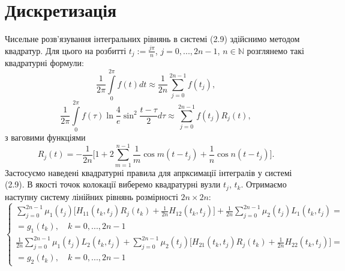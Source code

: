 \documentclass[a4 paper,12pt,ukrainian]{report}
\begin{document}
\section{Дискретизація}
\hspace*{\parindent}Чисельне розв'язування інтегральних рівнянь в системі (2.9) здійснимо методом квадратур. Для цього на розбитті $t_{j}:=\frac{j\pi}{n}$, $j=0,...,2n-1$, $n\in\mathbb{N}$ розглянемо такі квадратурні формули:
\begin{equation*}
\displaystyle
\frac{1}{2\pi}\int\limits_{0}^{2\pi}f(t)dt\approx
\frac{1}{2n}\sum\limits_{j=0}^{2n-1}f(t_{j}),
\end{equation*}
\begin{equation*}
\displaystyle
\frac{1}{2\pi}\int\limits_{0}^{2\pi}f(\tau)\ln{\frac{4}{e}\sin^2\frac{t-\tau}{2}}d\tau\approx\sum\limits_{j=0}^{2n-1}f(t_{j})R_{j}(t),
\end{equation*}
з ваговими функціями
\begin{equation*}
\displaystyle
R_{j}(t) = -\frac{1}{2n}\Big[1+2\sum\limits_{m=1}^{n-1}{\frac{1}{m}\cos{m(t-t_{j})}} + \frac{1}{n}\cos{n(t-t_{j})}\Big].
\end{equation*}
\hspace*{\parindent}Застосуємо наведені квадратурні правила для апрксимації інтегралів у системі (2.9). В якості точок колокації виберемо квадратурні вузли $t_{j}$, $t_{k}$. Отримаємо наступну систему лінійних рівнянь розмірності $2n\times 2n$:
\begin{equation}
\left\{
\begin{array}{c}
\displaystyle
\sum\limits_{j=0}^{2n-1} \mu_1(t_j)\Big[H_{11}(t_k,t_j)R_j(t_k)+\frac{1}{2n}H_{12}(t_k,t_j)\Big]+\frac{1}{2n}\sum\limits_{j=0}^{2n-1} \mu_2(t_j)L_1(t_k,t_j)=\\
\displaystyle
=g_1(t_k), \quad k=0,...,2n-1\\
\displaystyle
\frac{1}{2n}\sum\limits_{j=0}^{2n-1} \mu_1(t_j)L_2(t_k,t_j)+\sum\limits_{j=0}^{2n-1} \mu_2(t_j)\Big[H_{21}(t_k,t_j)R_j(t_k)+\frac{1}{2n}H_{22}(t_k,t_j)\Big]=\\
\displaystyle
=g_2(t_k), \quad k=0,...,2n-1
\end{array}
\right.
\end{equation}
\end{document}
